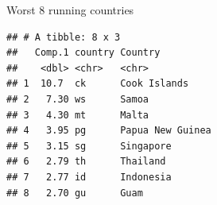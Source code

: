 \documentclass[
  ignorenonframetext,
]{beamer}
\newenvironment{Shaded}{\begin{snugshade}}{\end{snugshade}}
\newcommand{\DataTypeTok}[1]{\textcolor[rgb]{0.13,0.29,0.53}{#1}}
\newcommand{\DecValTok}[1]{\textcolor[rgb]{0.00,0.00,0.81}{#1}}
\newcommand{\FloatTok}[1]{\textcolor[rgb]{0.00,0.00,0.81}{#1}}
\newcommand{\KeywordTok}[1]{\textcolor[rgb]{0.13,0.29,0.53}{\textbf{#1}}}
\newcommand{\NormalTok}[1]{#1}
\newcommand{\OperatorTok}[1]{\textcolor[rgb]{0.81,0.36,0.00}{\textbf{#1}}}
\newcommand{\StringTok}[1]{\textcolor[rgb]{0.31,0.60,0.02}{#1}}
\begin{document}
\begin{frame}[fragile]{Worst 8 running countries}
\protect\hypertarget{worst-8-running-countries}{}

\footnotesize

\begin{Shaded}
\end{Shaded}

\begin{verbatim}
## # A tibble: 8 x 3
##   Comp.1 country Country         
##    <dbl> <chr>   <chr>           
## 1  10.7  ck      Cook Islands    
## 2   7.30 ws      Samoa           
## 3   4.30 mt      Malta           
## 4   3.95 pg      Papua New Guinea
## 5   3.15 sg      Singapore       
## 6   2.79 th      Thailand        
## 7   2.77 id      Indonesia       
## 8   2.70 gu      Guam
\end{verbatim}

\normalsize

\end{frame}
\end{document}
